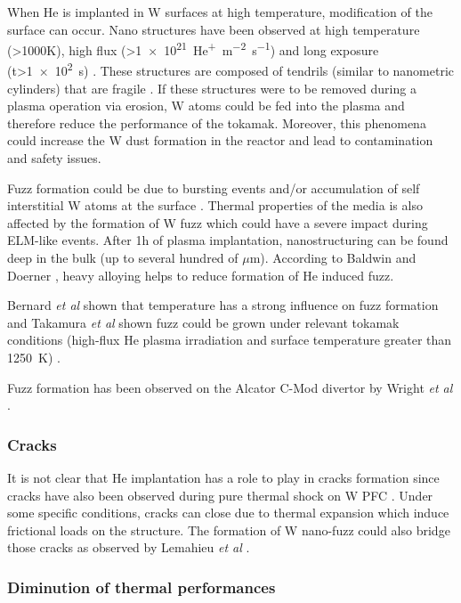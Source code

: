 When He is implanted in W surfaces at high temperature, modification of the surface can occur.
Nano structures have been observed at high temperature (>1000K), high flux (>\SI{1e21}{He^+.m^{-2}.s^{-1}}) and long exposure (t>\SI{1e2}{s}) \cite{baldwin_formation_2010}.
These structures are composed of tendrils (similar to nanometric cylinders) that are fragile \cite{nishijima_sputtering_2011}.
If these structures were to be removed during a plasma operation via erosion, W atoms could be fed into the plasma and therefore reduce the performance of the tokamak.
Moreover, this phenomena could increase the W dust formation in the reactor and lead to contamination and safety issues.

Fuzz formation could be due to bursting events and/or accumulation of self interstitial W atoms at the surface \cite{baldwin_effects_2009, baldwin_helium_2008, woller_dynamic_2015, hammond_helium_2017}.
Thermal properties of the media is also affected by the formation of W fuzz \cite{wirtz_influence_2016} which could have a severe impact during ELM-like events.
After 1h of plasma implantation, nanostructuring can be found deep in the bulk (up to several hundred of $\mu$m).
According to Baldwin and Doerner \cite{baldwin_formation_2010}, heavy alloying helps to reduce formation of He induced fuzz.

Bernard \textit{et al} shown that temperature has a strong influence on fuzz formation \cite{bernard_temperature_2017} and Takamura \textit{et al} shown fuzz could be grown under relevant tokamak conditions (high-flux He plasma irradiation and surface temperature greater than \SI{1250}{K}) \cite{takamura_formation_2006}.


Fuzz formation has been observed on the Alcator C-Mod divertor by Wright \textit{et al} \cite{wright_tungsten_2012}.

\subsubsection{Cracks}

It is not clear that He implantation has a role to play in cracks formation since cracks have also been observed during pure thermal shock on W PFC \cite{wirtz_influence_2016}.
Under some specific conditions, cracks can close due to thermal expansion which induce frictional loads on the structure.
The formation of W nano-fuzz could also bridge those cracks as observed by Lemahieu \textit{et al} \cite{lemahieu_h/he_2016}.

\subsubsection{Diminution of thermal performances}

